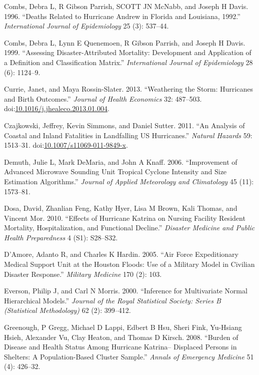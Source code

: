 \documentclass[]{elsarticle} %
\begin{document}
\hypertarget{ref-Combs1996}{}
Combs, Debra L, R Gibson Parrish, SCOTT JN McNabb, and Joseph H Davis.
1996. ``Deaths Related to Hurricane Andrew in Florida and Louisiana,
1992.'' \emph{International Journal of Epidemiology} 25 (3): 537--44.

\hypertarget{ref-Combs1999}{}
Combs, Debra L, Lynn E Quenemoen, R Gibson Parrish, and Joseph H Davis.
1999. ``Assessing Disaster-Attributed Mortality: Development and
Application of a Definition and Classification Matrix.''
\emph{International Journal of Epidemiology} 28 (6): 1124--9.

\hypertarget{ref-Currie2013}{}
Currie, Janet, and Maya Rossin-Slater. 2013. ``Weathering the Storm:
Hurricanes and Birth Outcomes.'' \emph{Journal of Health Economics} 32:
487--503.
doi:\href{https://doi.org/10.1016/j.jhealeco.2013.01.004}{10.1016/j.jhealeco.2013.01.004}.

\hypertarget{ref-Czajkowski2011}{}
Czajkowski, Jeffrey, Kevin Simmons, and Daniel Sutter. 2011. ``An
Analysis of Coastal and Inland Fatalities in Landfalling US
Hurricanes.'' \emph{Natural Hazards} 59: 1513--31.
doi:\href{https://doi.org/10.1007/s11069-011-9849-x}{10.1007/s11069-011-9849-x}.

\hypertarget{ref-Demuth2006}{}
Demuth, Julie L, Mark DeMaria, and John A Knaff. 2006. ``Improvement of
Advanced Microwave Sounding Unit Tropical Cyclone Intensity and Size
Estimation Algorithms.'' \emph{Journal of Applied Meteorology and
Climatology} 45 (11): 1573--81.

\hypertarget{ref-Dosa2010}{}
Dosa, David, Zhanlian Feng, Kathy Hyer, Lisa M Brown, Kali Thomas, and
Vincent Mor. 2010. ``Effects of Hurricane Katrina on Nursing Facility
Resident Mortality, Hospitalization, and Functional Decline.''
\emph{Disaster Medicine and Public Health Preparedness} 4 (S1):
S28--S32.

\hypertarget{ref-Damore2005}{}
D'Amore, Adanto R, and Charles K Hardin. 2005. ``Air Force Expeditionary
Medical Support Unit at the Houston Floods: Use of a Military Model in
Civilian Disaster Response.'' \emph{Military Medicine} 170 (2): 103.

\hypertarget{ref-Everson2000}{}
Everson, Philip J, and Carl N Morris. 2000. ``Inference for Multivariate
Normal Hierarchical Models.'' \emph{Journal of the Royal Statistical
Society: Series B (Statistical Methodology)} 62 (2): 399--412.

\hypertarget{ref-Greenough2008}{}
Greenough, P Gregg, Michael D Lappi, Edbert B Hsu, Sheri Fink, Yu-Hsiang
Hsieh, Alexander Vu, Clay Heaton, and Thomas D Kirsch. 2008. ``Burden of
Disease and Health Status Among Hurricane Katrina-- Displaced Persons in
Shelters: A Population-Based Cluster Sample.'' \emph{Annals of Emergency
Medicine} 51 (4): 426--32.
\end{document}
